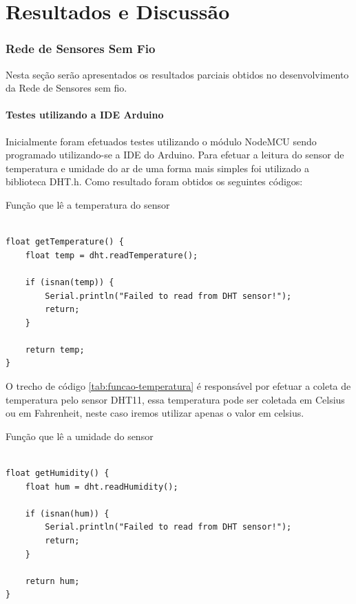 \chapter{Resultados e Discussão}

\subsection{Rede de Sensores Sem Fio}
Nesta seção serão apresentados os resultados parciais obtidos no desenvolvimento da Rede de Sensores sem fio.

\subsubsection{Testes utilizando a IDE Arduino}
Inicialmente foram efetuados testes utilizando o módulo NodeMCU sendo programado utilizando-se a IDE do Arduino. Para efetuar a leitura do sensor de temperatura e umidade do ar de uma forma mais simples foi utilizado a biblioteca DHT.h. Como resultado foram obtidos os seguintes códigos:

\begin{table}[H]
\centering
\caption{Função que lê a temperatura do sensor}
\vspace{-\baselineskip}
\begin{verbatim}

float getTemperature() {
    float temp = dht.readTemperature();
    
    if (isnan(temp)) {
        Serial.println("Failed to read from DHT sensor!");
        return;
    }
    
    return temp;
}
\end{verbatim}
\vspace{-1.2cm}
\label{tab:funcao-temperatura}
\end{table}

O trecho de código \ref{tab:funcao-temperatura} é responsável por efetuar a coleta de temperatura pelo sensor DHT11, essa temperatura pode ser coletada em Celsius ou em Fahrenheit, neste caso iremos utilizar apenas o valor em celsius.

\begin{table}[H]
\centering
\caption{Função que lê a umidade do sensor}
\vspace{-\baselineskip}
\begin{verbatim}

float getHumidity() {
    float hum = dht.readHumidity();
    
    if (isnan(hum)) {
        Serial.println("Failed to read from DHT sensor!");
        return;
    }
    
    return hum;
}
\end{verbatim}
\vspace{-1.2cm}
\label{tab:funcao-umidade}
\end{table}


